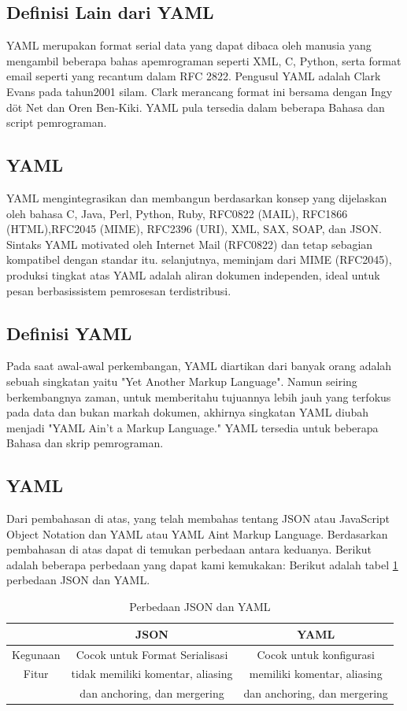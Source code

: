 \documentclass[a4paper]{article}
\begin{document}
\subsection{Definisi Lain dari YAML}
YAML merupakan format serial data yang dapat dibaca oleh manusia yang mengambil beberapa bahas apemrograman seperti XML, C, Python, serta format email seperti yang recantum dalam RFC 2822. Pengusul YAML adalah Clark Evans pada tahun2001 silam. Clark merancang format ini bersama dengan Ingy döt Net dan Oren Ben-Kiki. YAML pula tersedia dalam beberapa Bahasa dan script pemrograman.
\subsection{YAML}
YAML mengintegrasikan dan membangun berdasarkan konsep yang dijelaskan oleh bahasa C, Java, Perl, Python, Ruby, RFC0822 (MAIL), RFC1866 (HTML),RFC2045 (MIME), RFC2396 (URI), XML, SAX, SOAP, dan JSON.
Sintaks YAML motivated oleh Internet Mail (RFC0822) dan tetap sebagian kompatibel dengan standar itu. selanjutnya, meminjam dari MIME (RFC2045), produksi tingkat atas YAML adalah aliran dokumen independen, ideal untuk pesan berbasissistem pemrosesan terdistribusi.
\subsection{Definisi YAML}
Pada saat awal-awal perkembangan, YAML diartikan dari banyak orang adalah sebuah singkatan yaitu "Yet Another Markup Language". Namun seiring berkembangnya zaman, untuk memberitahu tujuannya lebih jauh yang terfokus pada data dan bukan markah dokumen, akhirnya singkatan YAML diubah menjadi "YAML Ain't a Markup Language." YAML tersedia untuk beberapa Bahasa dan skrip pemrograman.
\subsection{YAML}
Dari pembahasan di atas, yang telah membahas tentang JSON atau JavaScript Object Notation dan YAML atau YAML Aint Markup Language. Berdasarkan pembahasan di atas dapat di temukan perbedaan antara keduanya. Berikut adalah beberapa perbedaan yang dapat kami kemukakan:
Berikut adalah tabel \ref{table:perbedaan} perbedaan JSON dan YAML.
\begin{table}[h]
\caption{Perbedaan JSON dan YAML}

\centering
\begin{tabular}{ccc}
\hline
&JSON&YAML\\
\hline
Kegunaan&Cocok untuk Format Serialisasi&Cocok untuk konfigurasi\\
\hline
Fitur&tidak memiliki komentar, aliasing&memiliki komentar, aliasing \\
&dan anchoring, dan  mergering& dan anchoring, dan  mergering\\
\hline
\end{tabular}
\label{table:perbedaan}
\end{table}
\end{document}

